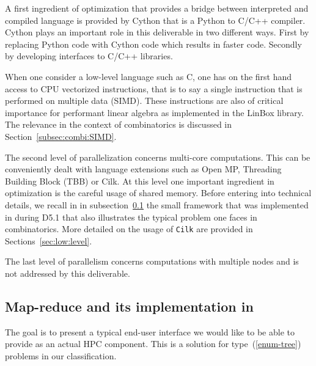 \documentclass{deliverablereport}
\newcommand{\Cilk}{\texttt{Cilk}\xspace}
\begin{document}
A first ingredient of optimization that provides a bridge between interpreted
and compiled language is provided by Cython that is a Python
to C/C++ compiler. Cython plays an important role in this deliverable in two
different ways. First by replacing Python code with Cython code which results
in faster code. Secondly by developing interfaces to C/C++ libraries.

When one consider a low-level language such as C, one has on the first hand
access to CPU vectorized instructions, that is to say a single instruction that
is performed on multiple data (SIMD). These
instructions are also of critical importance for performant linear
algebra as implemented in the LinBox library. The relevance in the context
of combinatorics is discussed in Section~\ref{subsec:combi:SIMD}.

The second level of parallelization concerns multi-core computations. This can
be conveniently dealt with language extensions such as Open MP, Threading
Building Block (TBB) or Cilk. At this level one important ingredient in
optimization is the careful usage of shared memory.  Before entering into
technical details, we recall in in subsection~\ref{subsec:map-reduce:Sage} the
small framework that was implemented in \Sage during D5.1 that also
illustrates the typical problem one faces in combinatorics.  More detailed on
the usage of \Cilk are provided in Sections~\ref{sec:low:level}.

The last level of parallelism concerns computations with multiple nodes
and is not addressed by this deliverable.

\subsection{Map-reduce and its implementation in \Sage}
\label{subsec:map-reduce:Sage}

The goal is to present a typical end-user interface we would like to be able
to provide as an actual HPC component. This is a solution for
type~(\ref{enum-tree}) problems in our classification.
\end{document}
